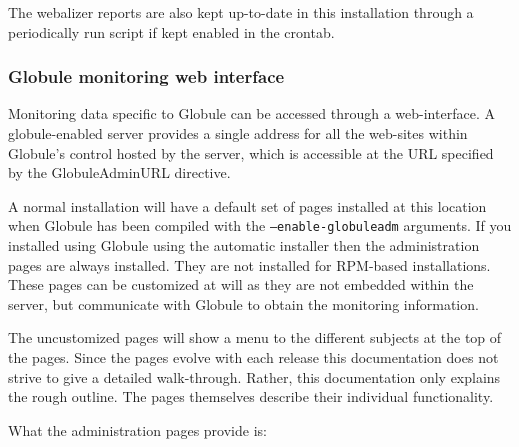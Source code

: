 \documentclass[10pt,a4paper]{article}
\makeatletter
\newenvironment{p}{\@open{P}{}}{\@close{P}}
\newenvironment{p}{}{\par}
\makeatother
\begin{document}
\begin{p}
The webalizer reports are also kept up-to-date in this installation through a
periodically run script if kept enabled in the crontab.
\end{p}

\subsubsection{Globule monitoring web interface}

\begin{p}
Monitoring data specific to Globule can be accessed through a web-interface.
A globule-enabled server provides a single address for all the web-sites
within Globule's control hosted by the server, which is accessible at the URL
specified by the GlobuleAdminURL directive.
\end{p}

\begin{p}
A normal installation will have a default set of pages installed at this
location when Globule has been compiled with the \texttt{--enable-globuleadm}
arguments.  If you installed using Globule using the automatic installer then
the administration pages are always installed. They are not installed for
RPM-based installations.  These pages can be customized at will as they are
not embedded within the server, but communicate with Globule to obtain the
monitoring information.
\end{p}

\begin{p}
The uncustomized pages will show a menu to the different subjects at the top
of the pages.  Since the pages evolve with each release this documentation
does not strive to give a detailed walk-through.  Rather, this documentation
only explains the rough outline.  The pages themselves describe their
individual functionality.
\end{p}

\begin{p}
What the administration pages provide is:
\end{p}
\end{document}
